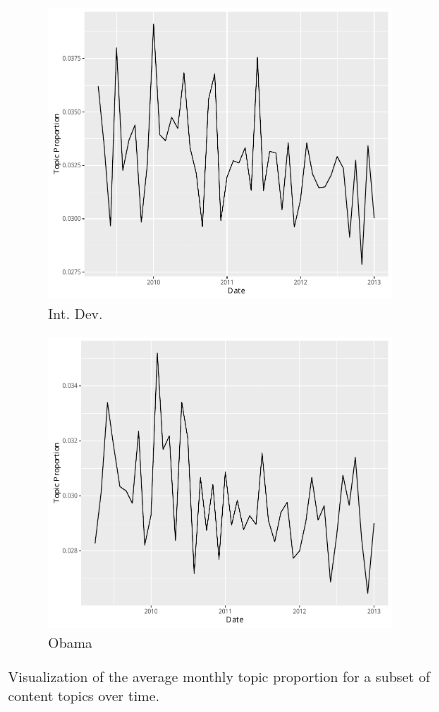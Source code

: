 \documentclass[12pt]{article}
\theoremstyle{definition}
\theoremstyle{algodesc}
\begin{document}
\begin{figure}[htb]
\begin{subfigure}[Int. Dev.]{.30\linewidth}
    \includegraphics[width=\linewidth]{../images/time_plot23.pdf}
    \caption{Int. Dev.} \label{fig:t5}
\end{subfigure}
\begin{subfigure}[Obama]{.30\linewidth}
    \includegraphics[width=\linewidth]{../images/time_plot25.pdf}
    \caption{Obama} \label{fig:t6}
\end{subfigure}
\caption{Visualization of the average monthly topic proportion for a subset of content topics over time.}
\label{fig:topic_time_plots}
\end{figure}
\end{document}
